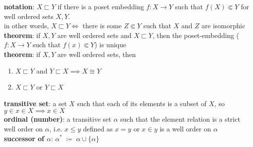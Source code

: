 \documentclass[a4paper]{article}
\begin{document}
\begin{framed}
	\noindent
	\textbf{notation}: $X \sqsubset Y$ if there is a poset embedding $f: X \rightarrow Y$ such that $f(X) \Subset Y$ for well ordered sets $X, Y$.\\
	in other words, $X \sqsubset Y \iff$ there is some $Z \Subset Y$ such that $X$ and $Z$ are isomorphic\\
	
	\noindent
	\textbf{theorem}: if $X, Y$ are well ordered sets and $X \sqsubset Y$, then the poset-embedding ($f: X \rightarrow Y$ such that $f(x) \Subset Y$) is unique\\
	\textbf{theorem}: if $X, Y$ are well ordered sets, then
	\begin{enumerate}[label=(\roman*), itemsep=-3pt, topsep=0pt]
		\item $X \sqsubset Y$ and $Y \sqsubset X \implies X \cong Y$
		\item $X \sqsubset Y$ or $Y \sqsubset X$\\
	\end{enumerate}
	
	\noindent
	\textbf{transitive set}: a set $X$ such that each of its elements is a subset of $X$, so $y \in x \in X \implies x \in X$\\
	\textbf{ordinal (number)}: a transitive set $\alpha$ such that the element relation is a strict well order on $\alpha$, i.e. $x \leq y$ defined as $x = y$ or $x \in y$ is a well order on $\alpha$\\
	\textbf{successor of $\alpha$}: $\alpha^* \; \coloneqq \; \alpha \cup \{ \alpha \}$\\
	

\end{framed}
\end{document}
